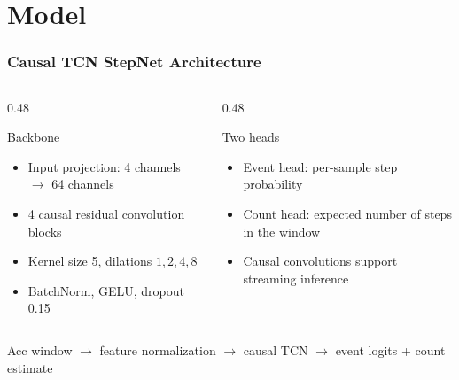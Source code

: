 \section{Model}

\begin{frame}
	\frametitle{Causal TCN StepNet Architecture}
	\begin{columns}[t]
		\begin{column}{0.48\textwidth}
			\begin{block}{Backbone}
				\begin{itemize}
					\item Input projection: 4 channels $\rightarrow$ 64 channels
					\item 4 causal residual convolution blocks
					\item Kernel size 5, dilations $1,2,4,8$
					\item BatchNorm, GELU, dropout 0.15
				\end{itemize}
			\end{block}
		\end{column}
		\begin{column}{0.48\textwidth}
			\begin{block}{Two heads}
				\begin{itemize}
					\item Event head: per-sample step probability
					\item Count head: expected number of steps in the window
					\item Causal convolutions support streaming inference
				\end{itemize}
			\end{block}
		\end{column}
	\end{columns}

	\vspace{0.2cm}
	\begin{center}
		\small
		Acc window $\rightarrow$ feature normalization $\rightarrow$ causal TCN $\rightarrow$ event logits + count estimate
	\end{center}
\end{frame}

